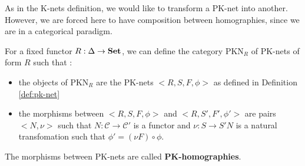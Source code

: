 As in the K-nets definition, we would like to transform a PK-net into another. However, we are forced here to have composition between homographies, since we are in a categorical paradigm.


\begin{defn}
    For a fixed functor $R: \Delta \rightarrow \bf Set$, we can define the category $ \text{PKN}_R$ of PK-nets of form $R$ such that :
    \begin{itemize}
        \item the objects of $\text{PKN}_R$\label{nomencl:PKNR} are the PK-nets $\big<R,S,F,\phi\big>$ as defined in Definition \ref{def:pk-net}
        \item the morphisms between $\big<R,S,F,\phi\big>$ and $\big<R,S',F',\phi'\big>$ are pairs $\big< N,\nu\big>$ such that $N : \mathcal{C} \rightarrow \mathcal{C}'$ is a functor and $\nu : S \rightarrow S'N$ is a natural transfomation such that $\phi' = (\nu F)\circ \phi$.
    \end{itemize}
\end{defn}

\begin{note}
    The morphisms between PK-nets are called \textbf{PK-homographies}.
\end{note}




